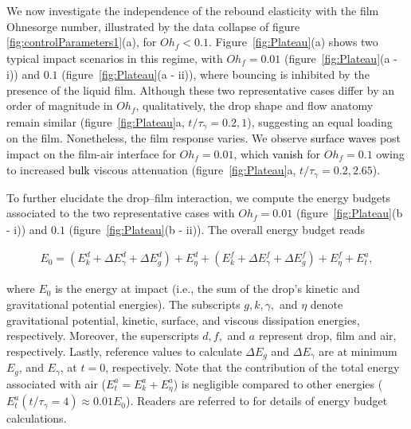 \documentclass[]{jfm}
\newcommand{\revRev}[1]{\textcolor{black}{#1}}
\newcommand{\Ohf}{\mathit{Oh}_\mathit{f}}
\begin{document}
We now investigate the independence of the rebound elasticity with the film Ohnesorge number, illustrated by the data collapse of figure \ref{fig:controlParameters1}(a), for $\Ohf  < 0.1$.
Figure~\ref{fig:Plateau}(a) shows two typical impact scenarios in this regime, with $\Ohf = 0.01$ (figure~\ref{fig:Plateau}(a - i)) and $0.1$ (figure~\ref{fig:Plateau}(a - ii)), where bouncing is inhibited by the presence of the liquid film. 
Although these two representative cases differ by an order of magnitude in $\Ohf$, qualitatively, the drop shape and flow anatomy remain similar (figure~\ref{fig:Plateau}a, $t/\tau_\gamma = 0.2, 1$), suggesting an equal loading on the film. 
Nonetheless, the film response varies. 
We observe \revRev{surface waves} post impact on the film-air interface for $\Ohf = 0.01$, which \revRev{vanish} for $\Ohf = 0.1$ owing to increased \revRev{bulk} viscous attenuation (figure~\ref{fig:Plateau}a, $t/\tau_\gamma = 0.2, 2.65$). 

To further elucidate the drop--film interaction, we compute the energy budgets associated to the two representative cases with $\Ohf = 0.01$ (figure~\ref{fig:Plateau}(b - i)) and $0.1$ (figure~\ref{fig:Plateau}(b - ii)). 
The overall energy budget reads

\begin{align}
	E_0 =  \left(E_k^d + \Delta E_\gamma^d + \Delta E_g^d\right) + E_\eta^d + \left(E_k^f + \Delta E_\gamma^f + \Delta E_g^f\right)  + E_\eta^f + E_t^a,
	\label{eqn:EnergyBudgetGlobal}
\end{align} 

\noindent where $E_0$ is the energy at impact (i.e., the sum of the drop's kinetic and gravitational potential energies). The subscripts $g, k, \gamma,$ and $\eta$ denote gravitational potential, kinetic, surface, and viscous dissipation energies, respectively. Moreover, the superscripts $d, f,$ and $a$ represent drop, film and air, respectively. Lastly, reference values to calculate $\Delta E_g$ and $\Delta E_\gamma$ are at minimum $E_g$, and $E_\gamma$, at $t = 0$, respectively. Note that the contribution of the total energy associated with air ($E_t^a = E_k^a + E_\eta^a$) is negligible compared to other energies ($E_t^a(t/\tau_\gamma = 4) \approx 0.01E_0$). Readers are referred to \citet{landau2013course, wildeman-2016-jfm, ramirezsoto-2020-sciadv, sanjay2022taylor} for details of energy budget calculations. 
\end{document}
